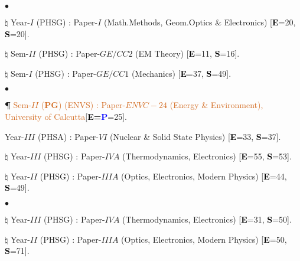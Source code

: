 \documentclass[margin,line]{res}
\newenvironment{list1}{
  \begin{list}{\ding{113}}{%
      \setlength{\itemsep}{0in}
      \setlength{\parsep}{0in} \setlength{\parskip}{0in}
      \setlength{\topsep}{0in} \setlength{\partopsep}{0in} 
      \setlength{\leftmargin}{0.17in}}}{\end{list}}
\newenvironment{list2}{
  \begin{list}{$\bullet$}{%
      \setlength{\itemsep}{0in}
      \setlength{\parsep}{0in} \setlength{\parskip}{0in}
      \setlength{\topsep}{0in} \setlength{\partopsep}{0in} 
      \setlength{\leftmargin}{0.2in}}}{\end{list}}
\begin{document}
\begin{resume}
\begin{list1}
\item[] \textcolor{iris}{}
\vspace{1mm}
\end{list1}
\begin{list2}
\item[$\pmb{\natural}$] Year-$I$ (PHSG) : Paper-$I$ (Math.Methods, Geom.Optics \& Electronics) [\textcolor{black}{\bf E}=20, \textcolor{black}{\bf S}=20]. 
\item[$\pmb{\natural}$] Sem-$II$ (PHSG) : Paper-$GE/CC2$ (EM Theory) [\textcolor{black}{\bf E}=11, \textcolor{black}{\bf S}=16]. 
\item[$\pmb{\natural}$] Sem-$I$ (PHSG) : Paper-$GE/CC1$ (Mechanics) [\textcolor{black}{\bf E}=37, \textcolor{black}{\bf S}=49]. 
\end{list2}
\begin{list1}
\item[] \textcolor{iris}{}
\vspace{1mm}
\end{list1}
\begin{list2}
\item[{\bf \P}] \textcolor{chocolate}{Sem-$II$ (\textcolor{iris}{\bf PG}) (ENVS) : Paper-$ENVC-24$ (Energy \& Environment), University of 
                Calcutta}[\textcolor{black}{\bf E=\textcolor{blue}{\bf P}}=25].
\item Year-$III$ (PHSA) : Paper-$VI$ (Nuclear \& Solid State Physics) [\textcolor{black}{\bf E}=33, \textcolor{black}{\bf S}=37]. 
\item[$\pmb{\natural}$] Year-$III$ (PHSG) : Paper-$IVA$ (Thermodynamics, Electronics) [\textcolor{black}{\bf E}=55, \textcolor{black}{\bf S}=53].
\item[$\pmb{\natural}$] Year-$II$ (PHSG) : Paper-$IIIA$ (Optics, Electronics, Modern Physics) [\textcolor{black}{\bf E}=44, \textcolor{black}{\bf S}=49].
\end{list2}
\begin{list1}
\item[] \textcolor{iris}{}
\vspace{1mm}
\end{list1}
\begin{list2}
\item[$\pmb{\natural}$] Year-$III$ (PHSG) : Paper-$IVA$ (Thermodynamics, Electronics) [\textcolor{black}{\bf E}=31, \textcolor{black}{\bf S}=50].
\item[$\pmb{\natural}$] Year-$II$ (PHSG) : Paper-$IIIA$ (Optics, Electronics, Modern Physics) [\textcolor{black}{\bf E}=50, \textcolor{black}{\bf S}=71].

\end{list2}
\end{resume}
\end{document}
